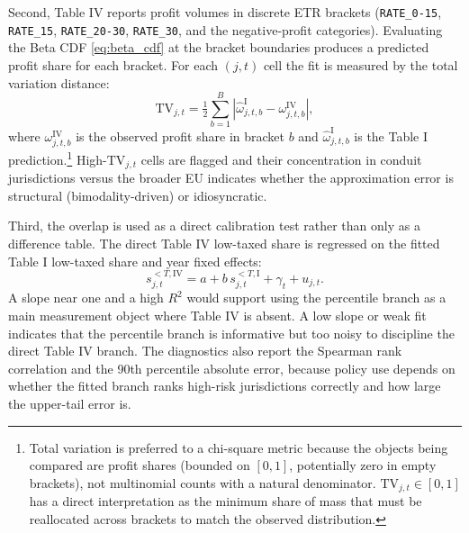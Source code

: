\documentclass[11pt,a4paper]{article}
\newcommand{\code}[1]{\texttt{#1}}
\begin{document}
Second, Table IV reports profit volumes in discrete ETR brackets (\code{RATE\_0-15}, \code{RATE\_15}, \code{RATE\_20-30}, \code{RATE\_30}, and the negative-profit categories). Evaluating the Beta CDF \eqref{eq:beta_cdf} at the bracket boundaries produces a predicted profit share for each bracket. For each $(j, t)$ cell the fit is measured by the total variation distance:
\begin{equation}\label{eq:chisq_crossval}
\text{TV}_{j,t} = \tfrac{1}{2}\sum_{b=1}^{B} \left|\hat{\omega}_{j,t,b}^{\text{I}} - \omega_{j,t,b}^{\text{IV}}\right|,
\end{equation}
where $\omega_{j,t,b}^{\text{IV}}$ is the observed profit share in bracket $b$ and $\hat{\omega}_{j,t,b}^{\text{I}}$ is the Table I prediction.\footnote{Total variation is preferred to a chi-square metric because the objects being compared are profit shares (bounded on $[0, 1]$, potentially zero in empty brackets), not multinomial counts with a natural denominator. $\text{TV}_{j,t} \in [0, 1]$ has a direct interpretation as the minimum share of mass that must be reallocated across brackets to match the observed distribution.} High-$\text{TV}_{j,t}$ cells are flagged and their concentration in conduit jurisdictions versus the broader EU indicates whether the approximation error is structural (bimodality-driven) or idiosyncratic.

Third, the overlap is used as a direct calibration test rather than only as a difference table. The direct Table IV low-taxed share is regressed on the fitted Table I low-taxed share and year fixed effects:
\begin{equation}\label{eq:crossval_calibration}
s_{j,t}^{<T,\text{IV}} = a + b\,s_{j,t}^{<T,\text{I}} + \gamma_t + u_{j,t}.
\end{equation}
A slope near one and a high $R^2$ would support using the percentile branch as a main measurement object where Table IV is absent. A low slope or weak fit indicates that the percentile branch is informative but too noisy to discipline the direct Table IV branch. The diagnostics also report the Spearman rank correlation and the 90th percentile absolute error, because policy use depends on whether the fitted branch ranks high-risk jurisdictions correctly and how large the upper-tail error is.
\end{document}
